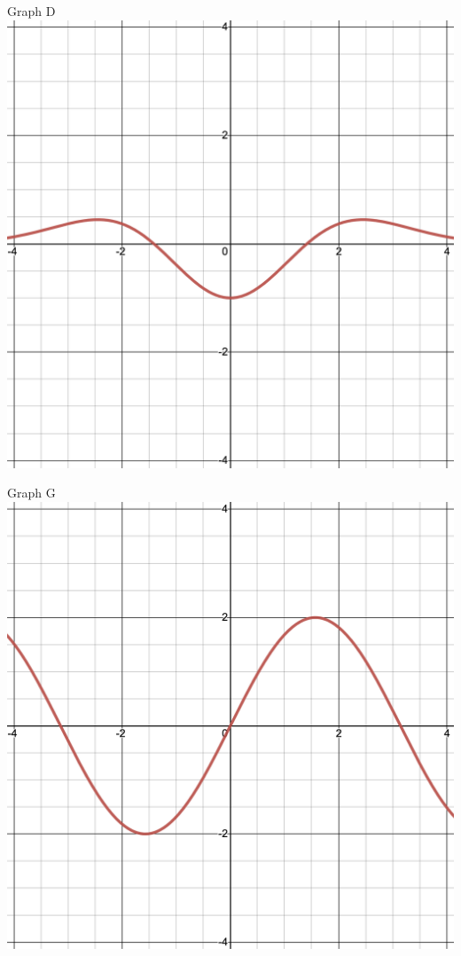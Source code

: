 \documentclass{siproblemset}
\begin{document}
\begin{multipartquestion}
\begin{multicols}{3}
            \begin{center}
                Graph D
                \includegraphics[width=\linewidth]{img/pt2-graph3c}
            \end{center}
            \begin{center}
                Graph G
                \includegraphics[width=\linewidth]{img/pt2-graph3g}

\end{center}
\end{multicols}
\end{multipartquestion}
\end{document}

